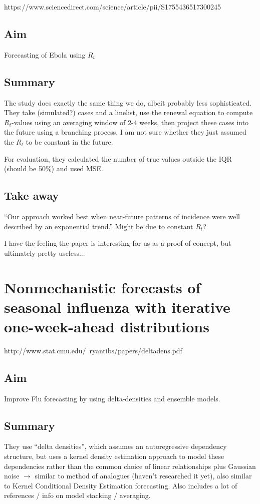 https://www.sciencedirect.com/science/article/pii/S1755436517300245

\subsection{Aim} 
Forecasting of Ebola using $R_t$

\subsection{Summary}
The study does exactly the same thing we do, albeit probably less sophisticated. They take (simulated?) cases and a linelist, use the renewal equation to compute $R_t$-values using an averaging window of 2-4 weeks, then project these cases into the future using a branching process. I am not sure whether they just assumed the $R_t$ to be constant in the future. 

For evaluation, they calculated the number of true values outside the IQR (should be 50\%) and used MSE. 

\subsection{Take away}
``Our approach worked best when near-future patterns of incidence were well described by an exponential trend.'' Might be due to constant $R_t$? 

I have the feeling the paper is interesting for us as a proof of concept, but ultimately pretty useless...



\section{Nonmechanistic forecasts of seasonal influenza with iterative one-week-ahead distributions}
http://www.stat.cmu.edu/~ryantibs/papers/deltadens.pdf

\subsection{Aim}
Improve Flu forecasting by using delta-densities and ensemble models. 


\subsection{Summary}
They use “delta densities”, which assumes an autoregressive dependency structure, but uses a kernel density estimation approach to model these dependencies rather than the common choice of linear relationships plus Gaussian noise $\rightarrow$ similar to method of analogues (haven't researched it yet), also similar to Kernel Conditional Density Estimation forecasting. Also includes a lot of references / info on model stacking / averaging. 

